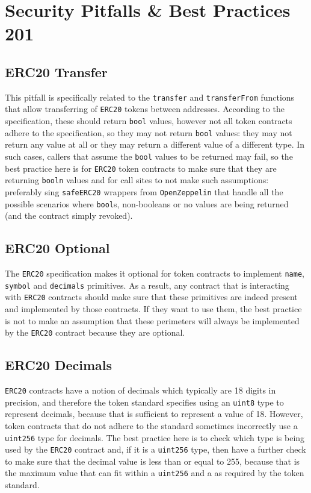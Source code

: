 \chapter{Security Pitfalls \& Best Practices 201}

\section{ERC20 Transfer}
This pitfall is specifically related to the \verb|transfer| and \verb|transferFrom| functions that allow transferring of \verb|ERC20| tokens between addresses. According to the specification, these should return \verb|bool| values, however not all token contracts adhere to the specification, so they may not return \verb|bool| values: they may not return any value at all or they may return a different value of a different type. In such cases, callers that assume the \verb|bool| values to be returned may fail, so the best practice here is for \verb|ERC20| token contracts to make sure that they are returning \verb|booln| values and for call sites to not make such assumptions: preferably sing \verb|safeERC20| wrappers from \verb|OpenZeppelin| that handle all the possible scenarios where \verb|bool|s, non-booleans or no values are being returned (and the contract simply revoked).

\section{ERC20 Optional}
The \verb|ERC20| specification makes it optional for token contracts to implement \verb|name|, \verb|symbol| and \verb|decimals| primitives. As a result, any contract that is interacting with \verb|ERC20| contracts should make sure that these primitives are indeed present and implemented by those contracts. If they want to use them, the best practice is not to make an assumption that these perimeters will always be implemented by the \verb|ERC20| contract because they are optional.

\section{ERC20 Decimals}
\verb|ERC20| contracts have a notion of decimals which typically are 18 digits in precision, and therefore the token standard specifies using an \verb|uint8| type to represent decimals, because that is sufficient to represent a value of 18. However, token contracts that do not adhere to the standard sometimes incorrectly use a \verb|uint256| type for decimals. The best practice here is to check which type is being used by the \verb|ERC20| contract and, if it is a \verb|uint256| type, then have a further check to make sure that the decimal value is less than or equal to 255, because that is the maximum value that can fit within a \verb|uint256| and a as required by the token standard.

